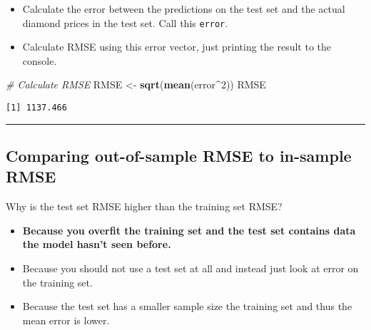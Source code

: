 \documentclass[
]{book}
\newenvironment{Shaded}{\begin{snugshade}}{\end{snugshade}}
\newcommand{\CommentTok}[1]{\textcolor[rgb]{0.56,0.35,0.01}{\textit{#1}}}
\newcommand{\DecValTok}[1]{\textcolor[rgb]{0.00,0.00,0.81}{#1}}
\newcommand{\KeywordTok}[1]{\textcolor[rgb]{0.13,0.29,0.53}{\textbf{#1}}}
\newcommand{\NormalTok}[1]{#1}
\newcommand{\OperatorTok}[1]{\textcolor[rgb]{0.81,0.36,0.00}{\textbf{#1}}}
\newcommand{\StringTok}[1]{\textcolor[rgb]{0.31,0.60,0.02}{#1}}
\providecommand{\tightlist}{%
  \setlength{\itemsep}{0pt}\setlength{\parskip}{0pt}}
\begin{document}
\begin{itemize}
\tightlist
\item
  Calculate the error between the predictions on the test set and the actual diamond prices in the test set. Call this \texttt{error}.
\end{itemize}

\begin{Shaded}
\end{Shaded}

\begin{itemize}
\tightlist
\item
  Calculate RMSE using this error vector, just printing the result to the console.
\end{itemize}

\begin{Shaded}
\begin{Highlighting}[]
\CommentTok{# Calculate RMSE}
\NormalTok{RMSE <-}\StringTok{ }\KeywordTok{sqrt}\NormalTok{(}\KeywordTok{mean}\NormalTok{(error}\OperatorTok{^}\DecValTok{2}\NormalTok{))}
\NormalTok{RMSE}
\end{Highlighting}
\end{Shaded}

\begin{verbatim}
[1] 1137.466
\end{verbatim}

\begin{center}\rule{0.5\linewidth}{0.5pt}\end{center}

\hypertarget{comparing-out-of-sample-rmse-to-in-sample-rmse}{%
\subsection*{Comparing out-of-sample RMSE to in-sample RMSE}\label{comparing-out-of-sample-rmse-to-in-sample-rmse}}

Why is the test set RMSE higher than the training set RMSE?

\begin{itemize}
\item
  \textbf{Because you overfit the training set and the test set contains data the model hasn't seen before.}
\item
  Because you should not use a test set at all and instead just look at error on the training set.
\item
  Because the test set has a smaller sample size the training set and thus the mean error is lower.
\end{itemize}
\end{document}
